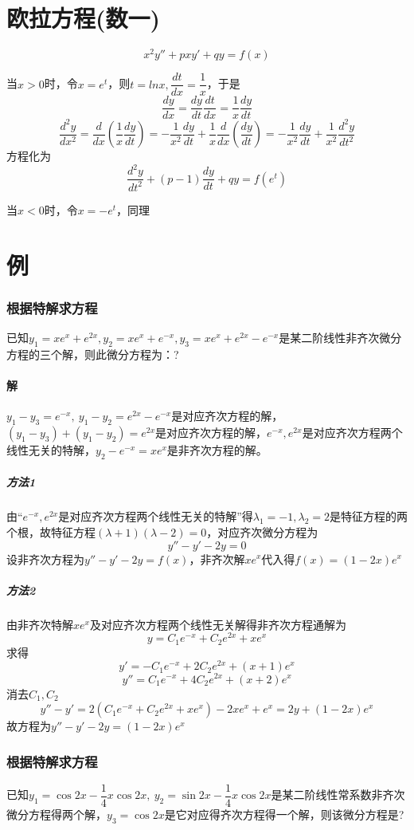 \section{欧拉方程(数一)}
\[x^2y'' + pxy' + qy = f(x)\]

当\(x > 0\)时，令\(x = e^t\)，则\(t = lnx, \dfrac{dt}{dx} = \dfrac{1}{x}\)，于是
\[\dfrac{dy}{dx} = \dfrac{dy}{dt} \dfrac{dt}{dx} = \dfrac{1}{x} \dfrac{dy}{dt}\]
\[\dfrac{d^2y}{dx^2} = \dfrac{d}{dx}(\dfrac{1}{x}\dfrac{dy}{dt}) = -\dfrac{1}{x^2}\dfrac{dy}{dt} + \dfrac{1}{x}\dfrac{d}{dx}(\dfrac{dy}{dt}) = -\dfrac{1}{x^2}\dfrac{dy}{dt} + \dfrac{1}{x^2}\dfrac{d^2y}{dt^2}\]
方程化为\[\dfrac{d^2y}{dt^2} + (p - 1)\dfrac{dy}{dt} + qy = f(e^t)\]

当\(x < 0\)时，令\(x = -e^t\)，同理


\section{例}

\subsubsection{根据特解求方程}
已知\(y_1 = xe^x + e^{2x}, y_2 = xe^x + e^{-x}, y_3 = xe^x + e^{2x} - e^{-x}\)是某二阶线性非齐次微分方程的三个解，则此微分方程为：?
\paragraph{解}
\(y_1 - y_3 = e^{-x},\ y_1 - y_2 = e^{2x} - e^{-x}\)是对应齐次方程的解，\((y_1 - y_3) + (y_1 - y_2) = e^{2x}\)是对应齐次方程的解，\(e^{-x}, e^{2x}\)是对应齐次方程两个线性无关的特解，\(y_2 - e^{-x} = xe^x\)是非齐次方程的解。

\subparagraph{方法1}
由“\(e^{-x}, e^{2x}\)是对应齐次方程两个线性无关的特解”得\(\lambda_1 = -1, \lambda_2 = 2\)是特征方程的两个根，故特征方程\((\lambda + 1)(\lambda - 2) = 0\)，对应齐次微分方程为\[y'' - y' - 2y = 0\]
设非齐次方程为\(y'' - y' - 2y = f(x)\)，非齐次解\(xe^x\)代入得\(f(x) = (1 - 2x)e^x\)

\subparagraph{方法2}
由非齐次特解\(xe^x\)及对应齐次方程两个线性无关解得非齐次方程通解为\[y = C_1e^{-x} + C_2e^{2x} + xe^x\]
求得\[y' = -C_1e^{-x} + 2C_2e^{2x} + (x + 1)e^x\]
\[y'' = C_1e^{-x} + 4C_2e^{2x} + (x + 2)e^x\]
消去\(C_1, C_2\)\[y'' - y' = 2(C_1e^{-x} + C_2e^{2x} + xe^x) - 2xe^x + e^x = 2y + (1 - 2x)e^x\]
故方程为\(y'' - y' - 2y = (1 - 2x)e^x\)


\subsubsection{根据特解求方程}
已知\(y_1 = \cos2x - \dfrac{1}{4}x\cos2x,\ y_2 = \sin2x - \dfrac{1}{4}x\cos2x\)是某二阶线性常系数非齐次微分方程得两个解，\(y_3 = \cos2x\)是它对应得齐次方程得一个解，则该微分方程是?

